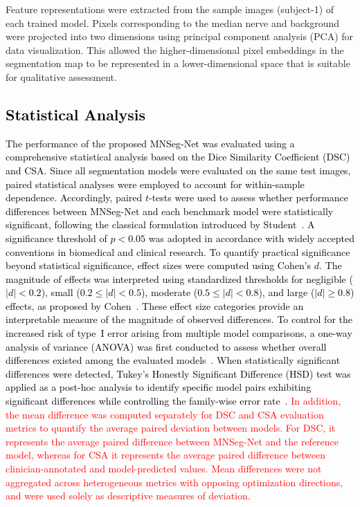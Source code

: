 Feature representations were extracted from the sample images (subject-1) of each trained model.  Pixels corresponding to the median nerve and background were projected into two dimensions using principal component analysis (PCA) for data visualization. This allowed the 
higher-dimensional pixel embeddings in the segmentation map to be represented in a lower-dimensional space that is suitable for qualitative assessment.



\textcolor{black}{\subsection{Statistical Analysis}}

\textcolor{black}{The performance of the proposed MNSeg-Net was evaluated using a comprehensive statistical analysis based on the Dice Similarity Coefficient (DSC) and CSA. Since all segmentation models were evaluated on the same test images, paired statistical analyses were employed to account for within-sample dependence. Accordingly, paired $t$-tests were used to assess whether performance differences between MNSeg-Net and each benchmark model were statistically significant, following the classical formulation introduced by Student~\cite{student1908probable}. A significance threshold of $p < 0.05$ was adopted in accordance with widely accepted conventions in biomedical and clinical research. To quantify practical significance beyond statistical significance, effect sizes were computed using Cohen’s $d$. The magnitude of effects was interpreted using standardized thresholds for negligible ($|d| < 0.2$), small ($0.2 \leq |d| < 0.5$), moderate ($0.5 \leq |d| < 0.8$), and large ($|d| \geq 0.8$) effects, as proposed by Cohen~\cite{cohen1988statistical}. These effect size categories provide an interpretable measure of the magnitude of observed differences. To control for the increased risk of type~I error arising from multiple model comparisons, a one-way analysis of variance (ANOVA) was first conducted to assess whether overall differences existed among the evaluated models~\cite{fisher1925statistical}. When statistically significant differences were detected, Tukey’s Honestly Significant Difference (HSD) test was applied as a post-hoc analysis to identify specific model pairs exhibiting significant differences while controlling the family-wise error rate~\cite{tukey1949comparing}. } \textcolor{red}{ In addition, the mean difference was computed separately for DSC and CSA evaluation metrics to quantify the average paired deviation between models. For DSC, it represents the average paired difference between MNSeg-Net and the reference model, whereas for CSA it represents the average paired difference between clinician-annotated and model-predicted values. Mean differences were not aggregated across heterogeneous metrics with opposing optimization directions, and were used solely as descriptive measures of deviation.}


